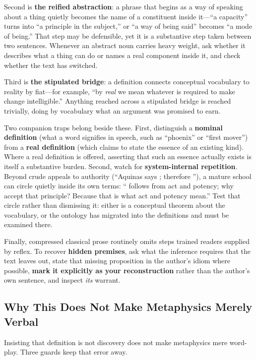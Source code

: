 Second is \textbf{the reified abstraction}: a phrase that begins as a way of speaking about a thing quietly becomes the name of a constituent inside it---``a capacity'' turns into ``a principle in the subject,'' or ``a way of being said'' becomes ``a mode of being.'' That step may be defensible, yet it is a substantive step taken between two sentences. Whenever an abstract noun carries heavy weight, ask whether it describes what a thing can do or names a real component inside it, and check whether the text has switched.

Third is \textbf{the stipulated bridge}: a definition connects conceptual vocabulary to reality by fiat---for example, ``by \emph{real} we mean whatever is required to make change intelligible.'' Anything reached across a stipulated bridge is reached trivially, doing by vocabulary what an argument was promised to earn.

Two companion traps belong beside these. First, distinguish a \textbf{nominal definition} (what a word signifies in speech, such as ``phoenix'' or ``first mover'') from a \textbf{real definition} (which claims to state the essence of an existing kind). Where a real definition is offered, asserting that such an essence actually exists is itself a substantive burden. Second, watch for \textbf{system-internal repetition}. Beyond crude appeals to authority (``Aquinas says ; therefore ''), a mature school can circle quietly inside its own terms: `` follows from act and potency; why accept that principle? Because that is what act and potency mean.'' Test that circle rather than dismissing it: either  is a conceptual theorem about the vocabulary, or the ontology has migrated into the definitions and must be examined there.

Finally, compressed classical prose routinely omits steps trained readers supplied by reflex. To recover \textbf{hidden premises}, ask what the inference requires that the text leaves out, state that missing proposition in the author's idiom where possible, \textbf{mark it explicitly as your reconstruction} rather than the author's own sentence, and inspect \emph{its} warrant.

\subsection{Why This Does Not Make Metaphysics Merely Verbal}

Insisting that definition is not discovery does not make metaphysics mere word-play. Three guards keep that error away.

